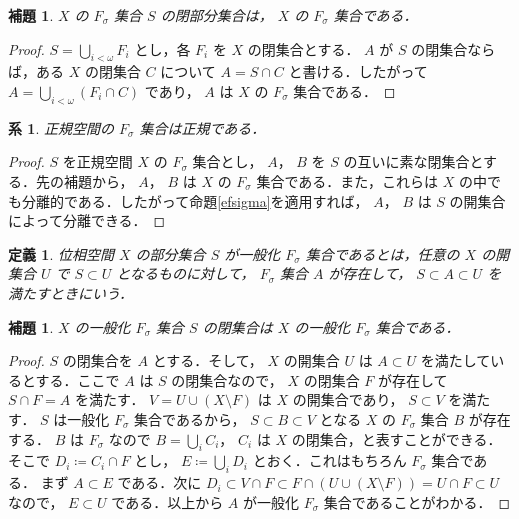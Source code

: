 \documentclass[leqno, 12pt]{ltjsarticle}
\newtheorem{cor}[thm]{系}
\newtheorem{lem}[thm]{補題}
\newtheorem{df}[thm]{定義}
\begin{document}
\begin{lem}
$X$
の
$F_{\sigma}$
集合
$S$
の閉部分集合は，
$X$
の
$F_{\sigma}$
集合である．
\end{lem}
\begin{proof}
$S=\bigcup_{i<\omega}F_{i}$
とし，各
$F_{i}$
を
$X$
の閉集合とする．
$A$
が
$S$
の閉集合ならば，ある
$X$
の閉集合
$C$
について
$A=S\cap C$
と書ける．したがって
$A=\bigcup_{i<\omega}(F_{i}\cap C)$
であり，
$A$
は
$X$
の
$F_{\sigma}$
集合である．
\end{proof}

\begin{cor}\label{cor:fs}
正規空間の
$F_{\sigma}$
集合は正規である．
\end{cor}
\begin{proof}
$S$
を正規空間
$X$
の
$F_{\sigma}$
集合とし，
$A$，
$B$
を
$S$
の互いに素な閉集合とする．先の補題から，
$A$，
$B$
は
$X$
の
$F_{\sigma}$
集合である．また，これらは
$X$
の中でも分離的である．したがって命題\ref{efsigma}を適用すれば，
$A$，
$B$
は
$S$
の開集合によって分離できる．
\end{proof}

\begin{df}
位相空間
$X$
の部分集合
$S$
が一般化
$F_{\sigma}$
集合であるとは，任意の
$X$
の開集合
$U$
で
$S\subset U$
となるものに対して，
$F_{\sigma}$
集合
$A$
が存在して，
$S\subset A\subset U$
を満たすときにいう．
\end{df}

\begin{lem}
$X$
の一般化
$F_{\sigma}$
集合
$S$
の閉集合は
$X$
の一般化
$F_{\sigma}$
集合である．
\end{lem}
\begin{proof}
$S$
の閉集合を
$A$
とする．そして，
$X$
の開集合
$U$
は
$A\subset U$
を満たしているとする．ここで
$A$
は
$S$
の閉集合なので，
$X$
の閉集合
$F$
が存在して
$S\cap F=A$
を満たす．
$V=U\cup (X\setminus F)$
は
$X$
の開集合であり，
$S\subset V$
を満たす．
$S$
は一般化
$F_{\sigma}$
集合であるから，
$S\subset B\subset V$
となる
$X$
の
$F_{\sigma}$
集合
$B$
が存在する．
$B$
は
$F_{\sigma}$
なので
$B=\bigcup_{i}C_{i}$，
$C_{i}$
は
$X$
の閉集合，と表すことができる．
そこで
$D_{i}\coloneqq C_{i}\cap F$
とし，
$E\coloneqq\bigcup_{i} D_{i}$
とおく．これはもちろん
$F_{\sigma}$
集合である．
まず
$A\subset E$
である．次に
$D_{i}\subset V\cap F\subset F\cap (U\cup (X\setminus F))=U\cap F\subset U$
なので，
$E\subset U$
である．以上から
$A$
が一般化
$F_{\sigma}$
集合であることがわかる．
\end{proof}
\end{document}
